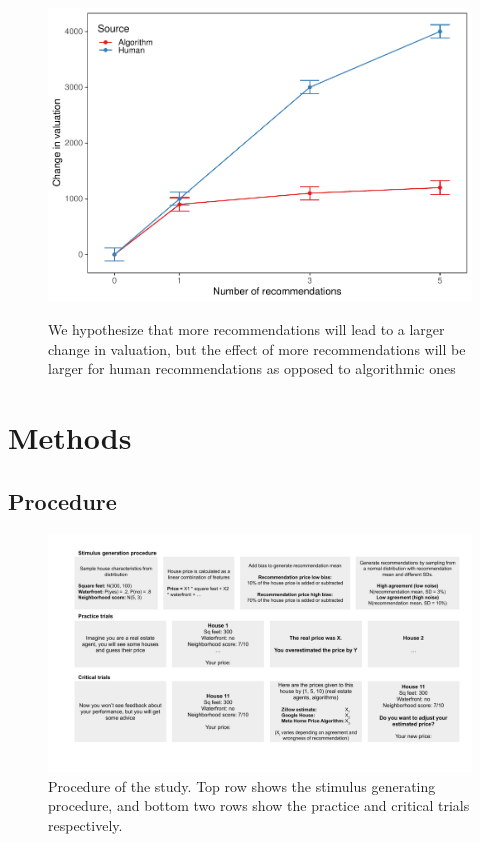 \documentclass[
  man ,floatsintext]{apa7}
\begin{document}
\begin{figure}
\center
\caption{We hypothesize that more recommendations will lead to a larger change in valuation, but the effect of more recommendations will be larger for human recommendations as opposed to algorithmic ones}
\includegraphics[width=.5\textwidth]{Test-Manuscript-in-R_files/figure-latex/hyp-1} 
\label{fig:hyp}
\end{figure}

\hypertarget{methods}{%
\section{Methods}\label{methods}}

\hypertarget{procedure}{%
\subsection{Procedure}\label{procedure}}

\begin{figure}
\caption{Procedure of the study. Top row shows the stimulus generating procedure, and bottom two rows show the practice and critical trials respectively.}\label{fig:procedure}
\includegraphics[width=\textwidth]{procedure} 
\end{figure}
\end{document}

